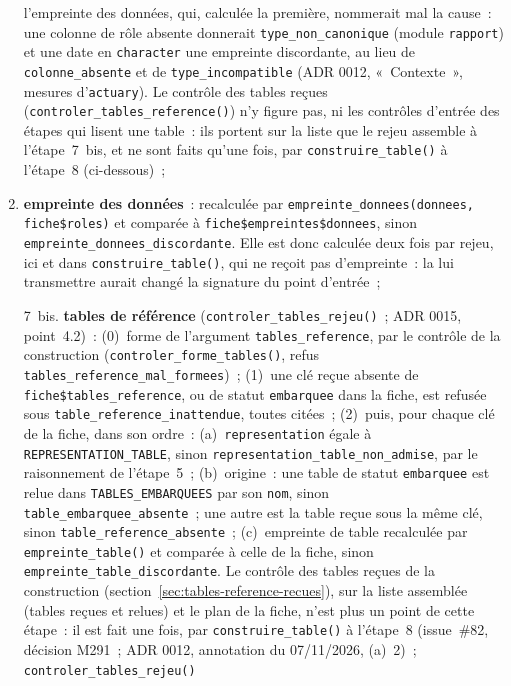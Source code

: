 \documentclass[a4paper,11pt]{article}
\newcommand{\code}[1]{\texttt{\small #1}}
\begin{document}
\begin{enumerate}[leftmargin=*, itemsep=2pt]
    l'empreinte des données, qui, calculée la première, nommerait mal la
    cause~: une colonne de rôle absente donnerait \code{type\_non\_canonique}
    (module \code{rapport}) et une date en \code{character} une empreinte
    discordante, au lieu de \code{colonne\_absente} et de
    \code{type\_incompatible} (ADR 0012, «~Contexte~», mesures
    d'\code{actuary}). Le contrôle des tables reçues
    (\code{controler\_tables\_reference()}) n'y figure pas, ni
    les contrôles d'entrée des étapes qui lisent une table~: ils portent sur
    la liste que le rejeu assemble à l'étape~7~bis, et ne sont faits
    qu'une fois, par \code{construire\_table()} à l'étape~8
    (ci-dessous)~;
  \item \textbf{empreinte des données}~: recalculée par
    \code{empreinte\_donnees(donnees, fiche\$roles)} et comparée à
    \code{fiche\$empreintes\$donnees}, sinon
    \code{empreinte\_donnees\_discordante}. Elle est donc calculée deux fois
    par rejeu, ici et dans \code{construire\_table()}, qui ne reçoit pas
    d'empreinte~: la lui transmettre aurait changé la signature du point
    d'entrée~;
  \item[7~bis.] \textbf{tables de référence} (\code{controler\_tables\_rejeu()}~;
    ADR 0015, point~4.2)~: (0)~forme de l'argument
    \code{tables\_reference}, par le contrôle de la construction
    (\code{controler\_forme\_tables()}, refus
    \code{tables\_reference\_mal\_formees})~; (1)~une clé reçue absente de
    \code{fiche\$tables\_reference}, ou de statut \code{embarquee} dans la
    fiche, est refusée sous \code{table\_reference\_inattendue}, toutes
    citées~; (2)~puis, pour chaque clé de la fiche, dans son ordre~:
    (a)~\code{representation} égale à \code{REPRESENTATION\_TABLE}, sinon
    \code{representation\_table\_non\_admise}, par le raisonnement de
    l'étape~5~; (b)~origine~: une table de statut \code{embarquee} est
    relue dans \code{TABLES\_EMBARQUEES} par son \code{nom}, sinon
    \code{table\_embarquee\_absente}~; une autre est la table reçue sous la
    même clé, sinon \code{table\_reference\_absente}~; (c)~empreinte de table
    recalculée par \code{empreinte\_table()} et comparée à celle de la
    fiche, sinon \code{empreinte\_table\_discordante}. Le contrôle des tables
    reçues de la construction (section~\ref{sec:tables-reference-recues}),
    sur la liste assemblée (tables reçues et relues) et le plan de la fiche,
    n'est plus un point de cette étape~: il est fait une fois, par
    \code{construire\_table()} à l'étape~8 (issue~\#82, décision M291~; ADR
    0012, annotation du 07/11/2026, (a)~2)~; \code{controler\_tables\_rejeu()}

\end{enumerate}
\end{document}

